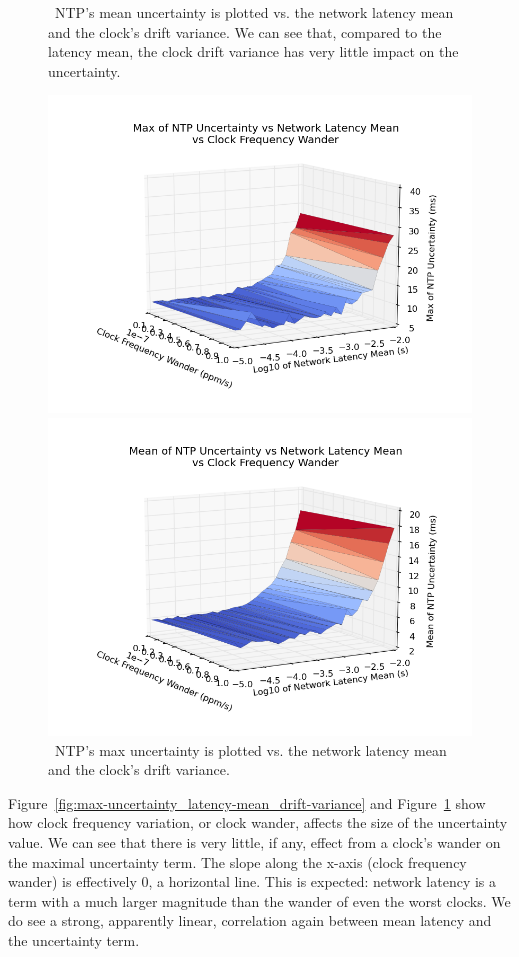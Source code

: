 \begin{figure}[!htbp]
  \caption{~NTP's mean uncertainty is plotted vs. the network latency mean and the clock's drift variance. We can see that, compared to the latency mean, the clock drift variance has very little impact on the uncertainty.}
  \label{fig:max-uncertainty_latency-mean_drift-variance}
  \includegraphics[width=0.8\linewidth]{max_max_err-mean_latency-drift_variance.png}

  \caption{~NTP's max uncertainty is plotted vs. the network latency mean and the clock's drift variance.}
  \label{fig:mean-uncertainty_latency-mean_drift-variance}
  \includegraphics[width=0.8\linewidth]{mean_max_err-mean_latency-drift_variance.png}
\end{figure}

Figure~\ref{fig:max-uncertainty_latency-mean_drift-variance} and 
Figure~\ref{fig:mean-uncertainty_latency-mean_drift-variance} show how clock frequency
variation, or clock wander, affects the size of the uncertainty value.
We can see that there is very little, if any,
effect from a clock's wander on the maximal
uncertainty term. The slope along the x-axis (clock frequency wander) is effectively 0,
a horizontal line. This is expected: network latency is a term with a much larger magnitude than
the wander of even the worst clocks. We do see a strong,
apparently linear, correlation again between mean latency and the uncertainty
term. 

